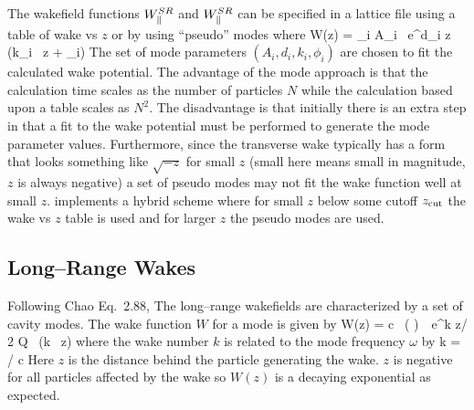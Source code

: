 The wakefield functions $W^{SR}_\parallel$ and $W^{SR}_\parallel$ can be specified in a \bmad
lattice file using a table of wake vs $z$ or by using ``pseudo'' modes
where
\Begineq
  W(z) = \sum_i A_i \, e^{d_i z} \, \sin (k_i \, z + \phi_i)
  \label{wadzk}
\Endeq
The set of mode parameters $(A_i, d_i, k_i, \phi_i)$ are chosen to fit
the calculated wake potential. The advantage of the mode approach is that
the calculation time scales as the number of particles $N$ while the
calculation based upon a table scales as $N^2$. The disadvantage is that
initially there is an extra step in that a fit to the wake potential must
be performed to generate the mode parameter values. Furthermore, since the
transverse wake typically has a form that looks something like $\sqrt{-z}$ 
for small $z$ (small here means small in magnitude, $z$ is always negative)
a set of pseudo modes may not fit the wake function well at small $z$. 
\bmad implements a hybrid scheme where for small $z$ below some cutoff
$z_{\rm{cut}}$ the wake vs $z$ table is used and for larger $z$ the pseudo
modes are used.


\subsection{Long--Range Wakes}

Following Chao\cite{b:chao} Eq.~2.88, The long--range wakefields are
characterized by a set of cavity modes. The wake function $W$ for a
mode is given by
\Begineq
  W(z) = c \, \left(  \right) \,\,
  e^{k z/ 2 Q} \, \sin (k \, z)
\Endeq
where the wake number $k$ is related to the mode frequency $\omega$ by
\Begineq
  k = \omega / c
\Endeq
Here $z$ is the distance behind the particle generating the wake. $z$
is negative for all particles affected by the wake so $W(z)$ is a
decaying exponential as expected.

